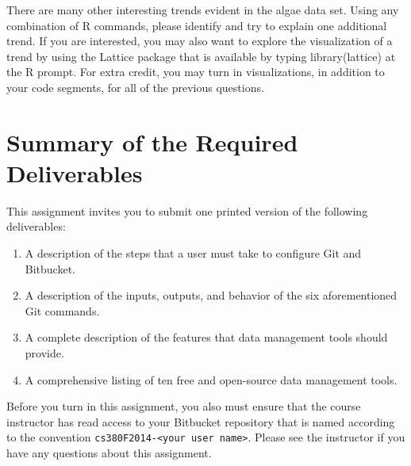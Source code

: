 There are many other interesting trends evident in the algae data set. Using any combination of R commands, please
identify and try to explain one additional trend. If you are interested, you may also want to explore the visualization
of a trend by using the Lattice package that is available by typing library(lattice) at the R prompt. For extra credit,
you may turn in visualizations, in addition to your code segments, for all of the previous questions.


\section*{Summary of the Required Deliverables}

  This assignment invites you to submit one printed version of the following deliverables:

  \vspace*{-.05in}
  \begin{enumerate}
    \setlength{\itemsep}{0pt}
    \item A description of the steps that a user must take to configure Git and Bitbucket.
    \item A description of the inputs, outputs, and behavior of the six aforementioned Git commands.
    \item A complete description of the features that data management tools should provide.
    \item A comprehensive listing of ten free and open-source data management tools.
  \end{enumerate}

\vspace*{-.1in} 

Before you turn in this assignment, you also must ensure that the course instructor has read access to your Bitbucket
repository that is named according to the convention {\tt cs380F2014-<your user name>}.  Please see the instructor if
you have any questions about this assignment. 






